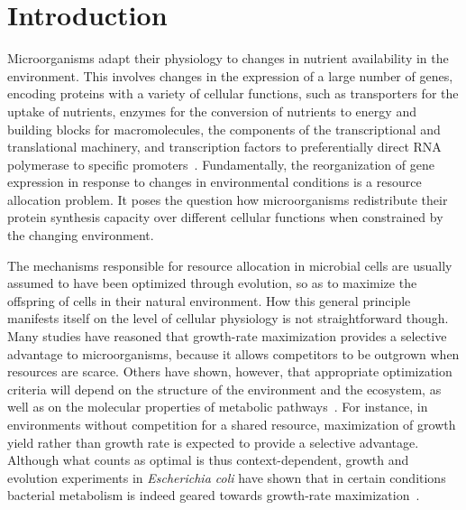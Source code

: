 \section*{Introduction}

Microorganisms adapt their physiology to changes in nutrient availability in the environment.
This involves changes in the expression of a large number of genes, encoding proteins with a variety of cellular functions, such as transporters for the uptake of nutrients, enzymes for the conversion of nutrients to energy and building blocks for macromolecules, the components of the transcriptional and translational machinery, and transcription factors to preferentially direct RNA polymerase to specific promoters~\cite{schaechter_microbe_2006,keseler_ecocyc_2013}.
Fundamentally, the reorganization of gene expression in response to changes in environmental conditions is a resource allocation problem.
It poses the question how microorganisms redistribute their protein synthesis capacity over different cellular functions when constrained by the changing environment.

The mechanisms responsible for resource allocation in microbial cells are usually assumed to have been optimized through evolution, so as to maximize the offspring of cells in their natural environment.
How this general principle manifests itself on the level of cellular physiology is not straightforward though.
Many studies have reasoned that growth-rate maximization provides a selective advantage to microorganisms, because it allows competitors to be outgrown when resources are scarce.
Others have shown, however, that appropriate optimization criteria will depend on the structure of the environment and the ecosystem, as well as on the molecular properties of metabolic pathways~\cite{frank_tradeoff_2010,maclean_tragedy_2008,schuetz_multidimensional_2012,schuster_maximization_2008,schuetz_systematic_2007}.
For instance,  in environments without competition for a shared resource, maximization of growth yield rather than growth rate is expected to provide a selective advantage.
Although what counts as optimal is thus context-dependent, growth and evolution experiments in \textit{Escherichia coli} have shown that in certain conditions bacterial metabolism is indeed geared towards growth-rate maximization~\cite{edwards_silico_2001,ibarra_escherichia_2002,lewis_omic_2010}.

